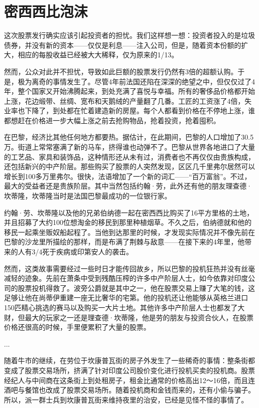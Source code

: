 \documentclass[12pt,oneside]{book}
\begin{document}
\section{密西西比泡沫}
\begin{mdframed}
这次股票发行确实应该引起投资者的担忧。我们这样想一想：投资者投入的是垃圾债券，并没有新的资本——仅仅是利息——注入公司，但是，随着资本份额的扩大，相应的每股收益已经被大大稀释，仅为原来的1/13。

然而，公众对此并不担忧，导致如此巨额的股票发行仍然有3倍的超额认购。于是，极为离奇的事情发生了。尽管4年前法国还陷在深深的绝望之中，但仅仅过了4年，整个国家又开始沸腾起来，到处充满了喜悦与幸福。所有的奢侈品价格都开始上涨，花边缎带、丝绸、宽布和天鹅绒的产量翻了几番。工匠的工资涨了4倍，失业率也下降了，到处都在忙着建造新的房屋。每个人都看到价格在不停地上涨，谁都想赶在价格进一步大幅上涨之前去抢购物品，抢着投资，抢着囤积。

在巴黎，经济比其他任何地方都要热。据估计，在此期间，巴黎的人口增加了30.5万。街道上常常塞满了新的马车，挤得谁也动弹不了。巴黎从世界各地进口了大量的工艺品、家具和装饰品，这种情形还从未有过，消费者也不再仅仅由贵族构成，还包括新兴的中产阶层。那些购买了股票的人突然发现，区区几千里弗尔居然可以增长到100多万里弗尔。很快，法语增加了一个新的词汇——“百万富翁”。不过，最大的受益者还是贵族阶层。其中当然包括约翰·劳，此外还有他的朋友理查德·坎蒂隆，坎蒂隆当时是法国巴黎最成功的一位银行家。

约翰·劳、坎蒂隆以及他的兄弟伯纳德一起在密西西比购买了16平方里格的土地，并且招募了大约100位想淘金的移民到那里种植烟草。不久之后，伯纳德就和他的移民一起乘坐贩奴船起程了。当他到达那里的时候，才发现实际情况并不像先前在巴黎的沙龙里所描绘的那样，而是布满了荆棘与敌意——在接下来的4年里，他带来的人有3/4死于疾病或印第安人的袭击。

然而，这类故事需要经过一些时日才能传回故乡，所以巴黎的投机狂热并没有丝毫减轻的迹象。先前在萧条中受到残酷压榨的许多中产阶层人士，如今依靠对印度公司的股票投机得救了。波旁公爵就是其中之一，他在股票交易上赚了大笔的钱，这足够让他在尚蒂伊重建一座无比奢华的宅第。他的投机还让他能够从英格兰进口150匹精心挑选的赛马以及购买一大片土地。其他许多中产阶层人士也都发了大财，但最大的玩家之一还是理查德·坎蒂隆，他是劳的朋友与投资合伙人，在股票价格还很高的时候，手里便累积了大量的股票。

...

随着牛市的继续，在劳位于坎康普瓦街的房子外发生了一些稀奇的事情：整条街都变成了股票交易场所，挤满了针对印度公司股价变化进行投机买卖的投机商。股票经纪人与中间商在这条街上到处租房子，租金比通常的价格高出12～16倍，而且连酒吧与餐馆也改成了股票交易场所。随着投机商和金钱而来的，还有小偷与骗子。所以，派一群士兵到坎康普瓦街来维持夜里的治安，已经是见怪不怪的事情了。


\end{mdframed}
\end{document}
